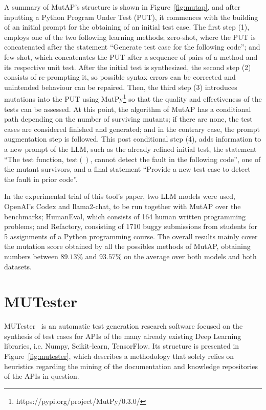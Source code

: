 \documentclass[%
  chapterprefix=false,%
  open=right,%
  twoside=true,%
  paper=a4,%
  logofile={Figures/logo.png},%
  thesistype=master,%
  UKenglish,%
]{se2thesis}
\begin{document}
A summary of MutAP's structure is shown in Figure~\ref{fig:mutap}, and after inputting a Python Program Under Test (PUT), it commences with the building of an initial prompt for the obtaining of an initial test case.
The first step (1), employs one of the two following learning methods; zero-shot, where the PUT is concatenated after the statement  ``Generate test case for the following code''; and few-shot, which concatenates the PUT after a sequence of pairs of a method and its respective unit test.
After the initial test is synthesized, the second step (2) consists of re-prompting it, so possible syntax errors can be corrected and unintended behaviour can be repaired.
Then, the third step (3) introduces mutations into the PUT using MutPy\footnote{https://pypi.org/project/MutPy/0.3.0/} so that the quality and effectiveness of the tests can be assessed.
At this point, the algorithm of MutAP has a conditional path depending on the number of surviving mutants; if there are none, the test cases are considered finished and generated; and in the contrary case, the prompt augmentation step is followed.
This post conditional step (4), adds information to a new prompt of the LLM, such as the already refined initial test, the statement ``The test function, \(\text{test}()\), cannot detect the fault in the
following code'', one of the mutant survivors, and a final statement ``Provide a new test case to detect the fault in prior code''.

In the experimental trial of this tool's paper, two LLM models were used, OpenAI's Codex and llama2-chat, to be run together with MutAP over the benchmarks; HumanEval, which consists of 164 human written programming problems; and Refactory, consisting of 1710 buggy submissions from students for 5 assignments of a Python programming course.
The overall results mainly cover the mutation score obtained by all the possibles methods of MutAP, obtaining numbers between \(89.13\%\) and \(93.57\%\) on the average over both models and both datasets.

\section{MUTester}

MUTester~\cite{DBLP:journals/corr/abs-2307-00404} is an automatic test generation research software focused on the synthesis of test cases for APIs of the many already existing Deep Learning libraries, i.e. Numpy, Scikit-learn, TensorFlow.
Its structure is presented in Figure~\ref{fig:mutester}, which describes a methodology that solely relies on heuristics regarding the mining of the documentation and knowledge repositories of the APIs in question. 
\end{document}
